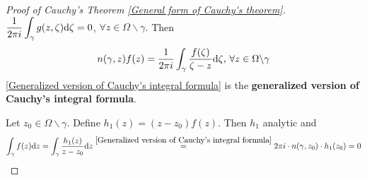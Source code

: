 \begin{proof}[Proof of Cauchy's Theorem \ref{General form of Cauchy's theorem}]
       $ \displaystyle\frac{1}{2\pi i}\int_\gamma g(z,\zeta)\mathrm{d} \zeta=0 $, $ \forall z\in \Omega\backslash \gamma $. Then 
       \begin{equation}
        n(\gamma,z)f(z)=\displaystyle\frac{1}{2\pi i}\int_\gamma\frac{f(\zeta)}{\zeta-z}\mathrm{d} \zeta ,\,\forall z\in \Omega\backslash \gamma\label{Generalized version of Cauchy's integral formula}
       \end{equation}
       \autoref{Generalized version of Cauchy's integral formula} is the \textbf{generalized version of Cauchy's integral formula}.

       Let  $ z_0\in \Omega\backslash \gamma $. Define  $ h_1(z)=(z-z_0)f(z) $. Then  $ h_1 $ analytic and 
       \begin{equation}
        \int_\gamma f(z)\mathrm{d} z=\int_\gamma\frac{h_1(z)}{z-z_0}\mathrm{d} z\overset{\eqref{Generalized version of Cauchy's integral formula}}{=}2\pi i\cdot n(\gamma,z_0)\cdot h_1(z_0)=0
       \end{equation}  
\end{proof}